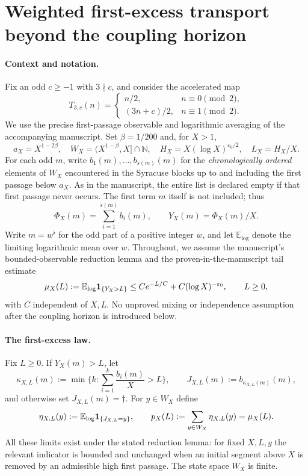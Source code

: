 \section{Weighted first-excess transport beyond the coupling horizon}
\label{sec:first-excess-transport}

\paragraph{Context and notation.}
Fix an odd $c\ge-1$ with $3\nmid c$, and consider the accelerated map
\[
 T_{3,c}(n)=\begin{cases}n/2,&n\equiv0\pmod2,\\
 (3n+c)/2,&n\equiv1\pmod2.
 \end{cases}
\]
We use the precise first-passage observable and logarithmic averaging
of the accompanying manuscript.  Set $\beta=1/200$ and, for $X>1$,
\[
 a_X=X^{1-2\beta},\quad
 W_X=(X^{1-\beta},X]\cap\mathbb N,\quad
 H_X=X(\log X)^{\varepsilon_0/2},\quad
 L_X=H_X/X.
\]
For each odd $m$, write $b_1(m),\ldots,b_{s(m)}(m)$ for the
\emph{chronologically ordered} elements of $W_X$ encountered in the
Syracuse blocks up to and including the first passage below $a_X$.
As in the manuscript, the entire list is declared empty if that
first passage never occurs.  The first term $m$ itself is not included;
thus
\[
  \Phi_X(m)=\sum_{i=1}^{s(m)}b_i(m),\qquad
  Y_X(m)=\Phi_X(m)/X.
\]
Write $m=w^\flat$ for the odd part of a positive integer $w$, and let
$\mathbb E_{\log}$ denote the limiting logarithmic mean over $w$.
Throughout, we assume the manuscript's bounded-observable reduction
lemma and the proven-in-the-manuscript tail estimate
\begin{equation}\label{eq:fe-tightness}
 \mu_X(L):=\mathbb E_{\log}{\bf1}_{\{Y_X>L\}}
 \le C e^{-L/C}+C(\log X)^{-\varepsilon_0},\qquad L\ge0,
\end{equation}
with $C$ independent of $X,L$.  No unproved mixing or independence
assumption after the coupling horizon is introduced below.

\paragraph{The first-excess law.}
Fix $L\ge0$. If $Y_X(m)>L$, let
\[
 \kappa_{X,L}(m):=\min\Big\{k:\sum_{i=1}^{k}\frac{b_i(m)}X>L\Big\},
 \qquad J_{X,L}(m):=b_{\kappa_{X,L}(m)}(m),
\]
and otherwise set $J_{X,L}(m)=\dagger$.
For $y\in W_X$ define
\begin{equation}\label{eq:fe-entrance}
 \eta_{X,L}(y):=\mathbb E_{\log}{\bf1}_{\{J_{X,L}=y\}},
 \qquad p_X(L):=\sum_{y\in W_X}\eta_{X,L}(y)=\mu_X(L).
\end{equation}
All these limits exist under the stated reduction lemma: for fixed
$X,L,y$ the relevant indicator is bounded and unchanged when an
initial segment above $X$ is removed by an admissible high first
passage.  The state space $W_X$ is finite.

